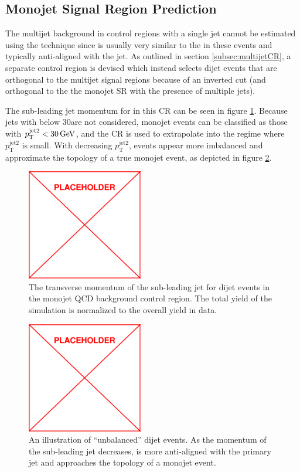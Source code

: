 \subsection{Monojet Signal Region Prediction}
\label{subsec:qcdMonojet}
The multijet background in control regions with a single jet cannot be estimated using the \dphi technique since \MET is usually very similar to the \HT in these events and typically anti-aligned with the jet. As outlined in section \ref{subsec:multijetCR}, a separate control region is devised which instead selects dijet events that are orthogonal to the multijet signal regions because of an inverted \dphilong cut (and orthogonal to the the monojet SR with the presence of multiple jets). 

The sub-leading jet momentum for in this CR can be seen in figure \ref{fig:subleadingJetPt}. Because jets with \pt below 30\GeV are not considered, monojet events can be classified as those with $p_{\mathrm{T}}^{\mathrm{jet2}} < 30\,\text{Ge\hspace{-.08em}V}$, and the CR is used to extrapolate into the regime where $p_{\mathrm{T}}^{\mathrm{jet2}}$ is small. With decreasing $p_{\mathrm{T}}^{\mathrm{jet2}}$, events appear more imbalanced and approximate the topology of a true monojet event, as depicted in figure \ref{fig:monojetCartoon}.
\begin{figure}
	\centering
	\includegraphics[width=0.45\textwidth]{figs/placeholder}
	\caption{The transverse momentum of the sub-leading jet for dijet events in the monojet QCD background control region. The total yield of the simulation is normalized to the overall yield in data.}
	\label{fig:subleadingJetPt}
\end{figure}
\begin{figure}
	\centering
	\includegraphics[width=0.45\textwidth]{figs/placeholder}
	\caption{An illustration of ``unbalanced'' dijet events. As the momentum of the sub-leading jet decreases, \MET is more anti-aligned with the primary jet and approaches the topology of a monojet event.}
	\label{fig:monojetCartoon}
\end{figure}

